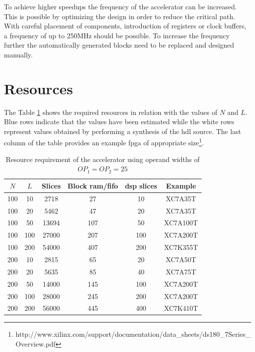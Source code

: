 \documentclass[mscthesis]{usiinfthesis}
\begin{document}
To achieve higher speedups the frequency of the accelerator can be increased.
This is possible by optimizing the design in order to reduce the critical
path. With careful placement of components, introduction of registers or clock
buffers, a frequency of up to 250MHz should be possible. To increase the
frequency further the automatically generated blocks need to be replaced and
designed manually.

\section{Resources}
\label{ch:conc_ach}

The Table \ref{tab:res_res} shows the required resources in relation with the
values of $N$ and $L$. Blue rows indicate that the values have been estimated
while the white rows represent values obtained by performing a synthesis of the
\gls{hdl} source. The last column of the table provides an example \gls{fpga}
of appropriate
size\footnote{http://www.xilinx.com/support/documentation/data\_sheets/ds180\_7Series\_Overview.pdf}.

\begin{table}
    \footnotesize
    \begin{center}
    \begin{tabular}{|c|c|c|c|c|c|}
        \hline
        $N$ & $L$ & Slices & Block \acrshort{ram}/\acrshort{fifo}
        & \acrshort{dsp} slices & Example \\
        \hline
        \hline
        100 & 10 & 2718  & 27  & 10 & XC7A35T \\
        100 & 20 & 5462  & 47  & 20 & XC7A35T \\
        100 & 50 & 13694 & 107 & 50 & XC7A100T\\
        \rowcolor{blue!25}
        100 & 100 & 27000 & 207 & 100 & XC7A200T\\
        \rowcolor{blue!25}
        100 & 200 & 54000 & 407 & 200 & XC7K355T\\
        200 & 10 & 2815  & 65  & 20 & XC7A50T \\
        200 & 20 & 5635  & 85  & 40 & XC7A75T \\
        \rowcolor{blue!25}
        200 & 50 & 14000  & 145 & 100 & XC7A200T \\
        \rowcolor{blue!25}
        200 & 100 & 28000 & 245 & 200 & XC7A200T \\
        \rowcolor{blue!25}
        200 & 200 & 56000 & 445 & 400 & XC7K410T \\
        \hline
    \end{tabular}
    \end{center}
    \caption{Resource requirement of the accelerator using operand widths of
        $OP_1 = OP_2 = 25$}
    \label{tab:res_res}
\end{table}
\end{document}
